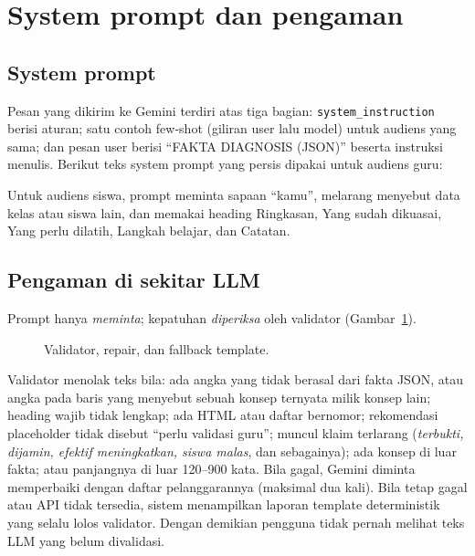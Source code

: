 \documentclass[11pt,a4paper]{article}
\begin{document}
\section{System prompt dan pengaman}

\subsection{System prompt}

Pesan yang dikirim ke Gemini terdiri atas tiga bagian: \texttt{system\_instruction} berisi aturan; satu contoh
few-shot (giliran user lalu model) untuk audiens yang sama; dan pesan user berisi ``FAKTA DIAGNOSIS (JSON)'' beserta
instruksi menulis. Berikut teks system prompt yang persis dipakai untuk audiens guru:



Untuk audiens siswa, prompt meminta sapaan ``kamu'', melarang menyebut data kelas atau siswa lain, dan memakai heading
Ringkasan, Yang sudah dikuasai, Yang perlu dilatih, Langkah belajar, dan Catatan.

\subsection{Pengaman di sekitar LLM}

Prompt hanya \emph{meminta}; kepatuhan \emph{diperiksa} oleh validator (Gambar~\ref{fig:guard}).

\begin{figure}[h]
  \centering
  \resizebox{0.95\linewidth}{!}{}
  \caption{Validator, repair, dan fallback template.}
  \label{fig:guard}
\end{figure}

Validator menolak teks bila: ada angka yang tidak berasal dari fakta JSON, atau angka pada baris yang menyebut sebuah
konsep ternyata milik konsep lain; heading wajib tidak lengkap; ada HTML atau daftar bernomor; rekomendasi placeholder
tidak disebut ``perlu validasi guru''; muncul klaim terlarang (\emph{terbukti, dijamin, efektif meningkatkan, siswa
malas}, dan sebagainya); ada konsep di luar fakta; atau panjangnya di luar 120--900 kata. Bila gagal, Gemini diminta
memperbaiki dengan daftar pelanggarannya (maksimal dua kali). Bila tetap gagal atau API tidak tersedia, sistem
menampilkan laporan template deterministik yang selalu lolos validator. Dengan demikian pengguna tidak pernah melihat
teks LLM yang belum divalidasi.
\end{document}
